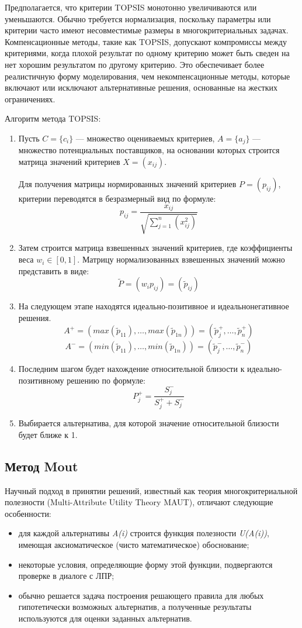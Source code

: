 Предполагается, что критерии TOPSIS монотонно увеличиваются или уменьшаются.
Обычно требуется нормализация, поскольку параметры или критерии часто имеют
несовместимые размеры в многокритериальных задачах.
Компенсационные методы, такие как TOPSIS, допускают компромиссы между
критериями, когда плохой результат по одному критерию может быть сведен
на нет хорошим результатом по другому критерию. Это обеспечивает более
реалистичную форму моделирования, чем некомпенсационные методы,
которые включают или исключают альтернативные решения, основанные на
жестких ограничениях.

Алгоритм метода TOPSIS:
\begin{enumerate}
	\item Пусть \(C = \{c_i\}\) --- множество оцениваемых критериев,
		\(A = \{a_j\}\) --- множество потенциальных поставщиков,
		на основании которых строится матрица значений критериев
		\(X = (x_{ij})\).\par
		Для получения матрицы нормированных значений критериев
		\(P = (p_{ij})\), критерии переводятся в безразмерный вид по формуле:
		\[p_{ij}=\frac{x_{ij}}{\sqrt{\sum_{j=1}^{n}(x_{ij}^2)}}\]
	\item Затем строится матрица взвешенных значений критериев,
		где коэффициенты веса \(w_i \in [0,1]\). Матрицу нормализованных
		взвешенных значений можно представить в виде:
		\[\tilde P=(w_i p_{ij})=(\tilde p_{ij})\]
	\item На следующем этапе находятся идеально-позитивное
		и идеальнонегативное решения.
		\[A^+=(max(\tilde p_{11}), \ldots, max(\tilde p_{1n}))
			=(\tilde p_j^+, \ldots, \tilde p_n^+)\]
		\[A^-=(min(\tilde p_{11}), \ldots, min(\tilde p_{1n}))
			=(\tilde p_j^-, \ldots, \tilde p_n^-)\]
	\item Последним шагом будет нахождение относительной близости к
		идеально-позитивному решению по формуле:
		\[P_j^+=\frac{S_{j}^-}{S_j^+ + S_j^-}\]
	\item Выбирается альтернатива, для которой значение относительной
		близости будет ближе к 1.
\end{enumerate}

\subsection{Метод Mout}
Научный подход в принятии решений, известный как теория многокритериальной
полезности (Multi-Attribute Utility Theory MAUT),
отличают следующие особенности:
\begin{itemize}
	\item для каждой альтернативы \textit{A(i)} строится функция
		полезности \textit{U(A(i))}, имеющая аксиоматическое
		(чисто математическое) обоснование;
	\item некоторые условия, определяющие форму этой функции,
		подвергаются проверке в диалоге с ЛПР;
	\item обычно решается задача построения решающего правила для любых
		гипотетически возможных альтернатив, а полученные результаты
		используются для оценки заданных альтернатив.
\end{itemize}

